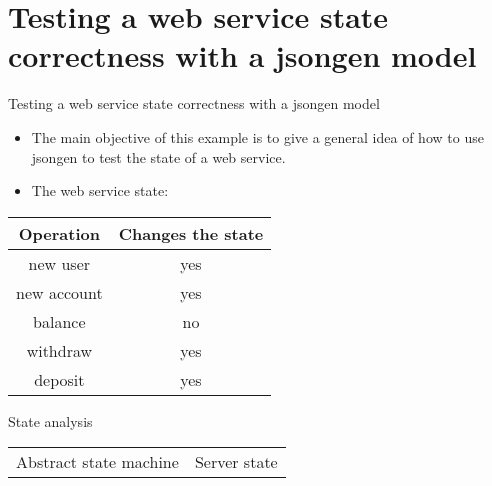 \section{Testing a web service state correctness with a jsongen model}

\begin{frame}{Testing a web service state correctness with a jsongen model}
  \begin{itemize}
  \item The main objective of this example is to give a general idea
    of how to use jsongen to test the state of a web service.
  \item The web service state:\\
  \end{itemize}
  \vspace{20pt}
  \centering
  \begin{tabular}{| c | c |}
    \hline
    \textbf{Operation}   & \textbf{Changes the state} \\ \hline
    new user    & yes \\ \hline
    new account & yes \\ \hline
    balance     & no \\ \hline
    withdraw    & yes \\ \hline
    deposit     & yes \\ \hline
  \end{tabular}
  \centering
\end{frame}

\begin{frame}{State analysis}
  \vspace{10pt}
  \begin{tabular}{p{7cm} l}
    {\Large Abstract state machine}&{\Large Server state}
  \end{tabular}
  \\
  \begin{figure}
    \centering
    \begin{overprint}[\textwidth]
    \end{overprint}
  \end{figure}
\end{frame}


